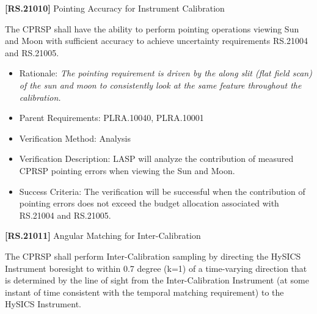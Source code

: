 \documentclass[12pt,oneside,oldfontcommands]{memoir}
\begin{document}
\textbf{[RS.21010]} Pointing Accuracy for Instrument Calibration

The \gls{CPRSP} shall have the ability to perform \gls{point}ing operations viewing Sun and Moon with sufficient accuracy to achieve uncertainty requirements \gls{RS}.21004 and \gls{RS}.21005.

\begin{itemize}
\item{} Rationale: \emph{The pointing requirement is driven by the along slit (flat field scan) of the sun and moon to consistently look at the same feature throughout the calibration.}

\item{} Parent Requirements: PLRA.10040, PLRA.10001

\item{} Verification Method: Analysis

\item{} Verification Description: \gls{LASP} will analyze the contribution of \gls{measure}d \gls{CPRSP} \gls{point}ing errors when viewing the Sun and Moon.

\item{} Success Criteria: The verification will be successful when the contribution of \gls{point}ing errors does not exceed the budget allocation associated with \gls{RS}.21004 and \gls{RS}.21005.

\end{itemize}

\textbf{[RS.21011]} Angular Matching for Inter-Calibration

The \gls{CPRSP} shall perform Inter-Calibration sampling by directing the \gls{HySICS} Instrument boresight to within 0.7 degree (k=1) of a time-varying direction that is determined by the line of sight from the Inter-Calibration Instrument (at some instant of time consistent with the temporal matching requirement) to the \gls{HySICS} Instrument.
\end{document}
